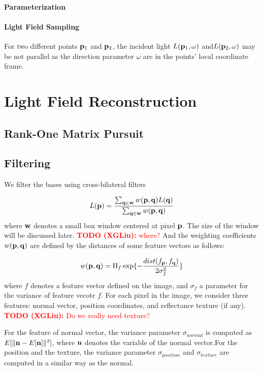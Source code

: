 \documentclass[review]{acmsiggraph}
\newcommand{\bfp}{{\bf p}}
\newcommand{\bfq}{{\bf q}}
\newcommand{\XGTODO}[1]{\textcolor{red}{{\bf TODO (XGLiu):} #1}}
\newcommand{\Equation}[1]{
	\begin{equation}
		#1
	\end{equation}
}
\begin{document}
\paragraph{Parameterization}


\paragraph{Light Field Sampling}
For two different points $\bfp_1$ and $\bfp_2$, the incident light $L(\bfp_1,\omega)$ and$L(\bfp_2,\omega)$ may be not parallel as the direction parameter $\omega$ are in the points' local coordinate frame.

\section{Light Field Reconstruction}

\subsection{Rank-One Matrix Pursuit}
\subsection{Filtering}

We filter the bases using cross-bilateral filters

\Equation{\nonumber
	L(\bfp)=\frac{\sum_{\bfq \in {\bf w}}w(\bfp,\bfq)L(\bfq)}
	{\sum_{\bfq \in {\bf w}}w(\bfp,\bfq)}
}%
where $\bf w$ denotes a small box window centered at pixel $\bfp$. The size of the window will be discussed later. \XGTODO{where?} And the weighting coefficients $w(\bfp,\bfq)$ are defined by the distances of some feature vectors as follows:
\Equation{\nonumber
	w(\bfp,\bfq)=\Pi_{f}\exp\{-\frac{dist(f_\bfp,f_\bfq)}{2\sigma_f^2}\} 
}%
where $f$ denotes a feature vector defined on the image, and $\sigma_f$ a parameter for the variance of feature vecotr $f$. For each pixel in the image, we consider three features: normal vector, position coordinates, and reflectance texture (if any). \XGTODO{Do we really need texture?}

For the feature of normal vector, the variance parameter $\sigma_{normal}$ is computed as $E[\|{\bf n}-E[{\bf n}] \|^2]$, where $\bf n$ denotes the variable of the normal vector.For the position and the texture, the variance parameter $\sigma_{position}$ and $\sigma_{texture}$ are computed in a similar way as the normal. 
\end{document}
